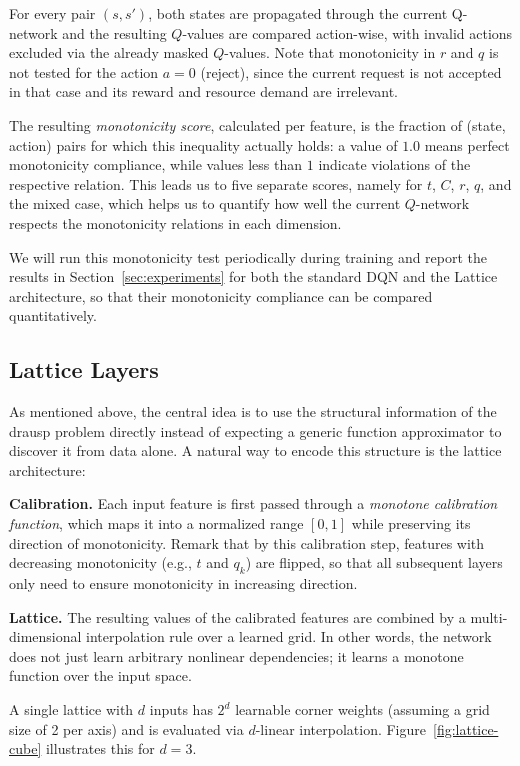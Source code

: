 For every pair $(s,s')$, both states are propagated through the current Q-network and the resulting $Q$-values are compared action-wise, with invalid actions excluded via the already masked $Q$-values. 
Note that monotonicity in $r$ and $q$ is not tested for the action $a=0$ (reject), since the current request is not accepted in that case and its reward and resource demand are irrelevant.

The resulting \emph{monotonicity score}, calculated per feature, is the fraction of (state, action) pairs for which this inequality actually holds: a value of $1.0$ means perfect monotonicity compliance, while values less than $1$ indicate violations of the respective relation. 
This leads us to five separate scores, namely for $t$, $C$, $r$, $q$, and the mixed case, which helps us to quantify how well the current $Q$-network respects the monotonicity relations in each dimension.

We will run this monotonicity test periodically during training and report the results in Section~\ref{sec:experiments} for both the standard DQN and the Lattice architecture, so that their monotonicity compliance can be compared quantitatively. 
\subsection{Lattice Layers}
\label{subsec:lattice}

As mentioned above, the central idea is to use the structural information of the \ac{drausp} problem directly instead of expecting a generic function approximator to discover it from data alone. A natural way to encode this structure is the lattice architecture: 
\vspace{0.5cm}

\textbf{Calibration.} 
Each input feature is first passed through a \textit{monotone calibration function}, which maps it into a normalized range $[0,1]$ while preserving its direction of monotonicity. 
Remark that by this calibration step, features with decreasing monotonicity (e.g., $t$ and $q_k$) are flipped, so that all subsequent layers only need to ensure monotonicity in increasing direction.

\textbf{Lattice.}
The resulting values of the calibrated features are combined by a multi-dimensional interpolation rule over a learned grid. 
In other words, the network does not just learn arbitrary nonlinear dependencies; it learns a monotone function over the input space.

A single lattice with $d$ inputs has $2^d$ learnable corner weights (assuming a grid size of 2 per axis) and is evaluated via $d$-linear interpolation. Figure~\ref{fig:lattice-cube} illustrates this for $d=3$. 


